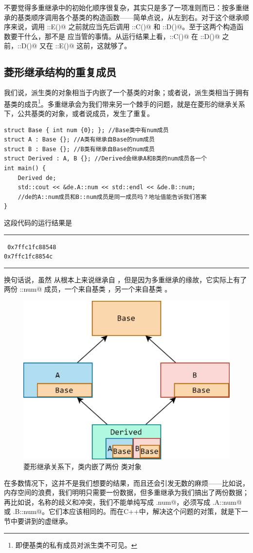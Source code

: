 不要觉得多重继承中的初始化顺序很复杂，其实只是多了一项准则而已：按多重继承的基类顺序调用各个基类的构造函数——简单点说，从左到右。对于这个继承顺序来说，调用 \lstinline@E::E()@ 之前就应当先后调用 \lstinline@C::C()@ 和 \lstinline@D::D()@。至于这两个构造函数要干什么，那不是 \lstinline@E@ 应当管的事情。从运行结果上看，\lstinline@C::C()@ 在 \lstinline@D::D()@ 之前，\lstinline@D::D()@ 又在 \lstinline@E::E()@ 这前，这就够了。\par
\subsection*{菱形继承结构的重复成员}
我们说，派生类的对象相当于内嵌了一个基类的对象；或者说，派生类相当于拥有基类的成员\footnote{即便基类的私有成员对派生类不可见。}。多重继承会为我们带来另一个棘手的问题，就是在菱形的继承关系下，公共基类的对象，或者说成员，发生了重复。\par
\begin{lstlisting}
struct Base { int num {0}; }; //Base类中有num成员
struct A : Base {}; //A类有继承自Base的num成员
struct B : Base {}; //B类有继承自Base的num成员
struct Derived : A, B {}; //Derived会继承A和B类的num成员各一个
int main() {
    Derived de;
    std::cout << &de.A::num << std::endl << &de.B::num;
    //de的A::num成员和B::num成员是同一成员吗？地址值能告诉我们答案
}
\end{lstlisting}
这段代码的运行结果是\\\noindent\rule{\linewidth}{.2pt}\texttt{
0x7ffc1fc88548\\
0x7ffc1fc8854c
}\\\noindent\rule{\linewidth}{.2pt}
换句话说，虽然 \lstinline@Derived@ 从根本上来说继承自 \lstinline@Base@，但是因为多重继承的缘故，它实际上有了两份 \lstinline@Base::num@ 成员，一个来自基类 \lstinline@A@，另一个来自基类 \lstinline@B@。\par
\begin{figure}[htbp]
    \centering
    \includegraphics[width=.56\textwidth]{../images/generalized_parts/10_diamond_inheritance.drawio.png}
    \caption{菱形继承关系下，\lstinline@Derived@ 类内嵌了两份 \lstinline@Base@ 类对象}
\end{figure}
在多数情况下，这并不是我们想要的结果，而且还会引发无数的麻烦——比如说，内存空间的浪费，我们明明只需要一份数据，但多重继承为我们搞出了两份数据；再比如说，名称的歧义和冲突，我们不能单纯写成 \lstinline@d.num@，必须写成 \lstinline@d.A::num@ 或 \lstinline@d.B::num@。它们本应该相同的。而在C++中，解决这个问题的对策，就是下一节中要讲到的虚继承。\par
